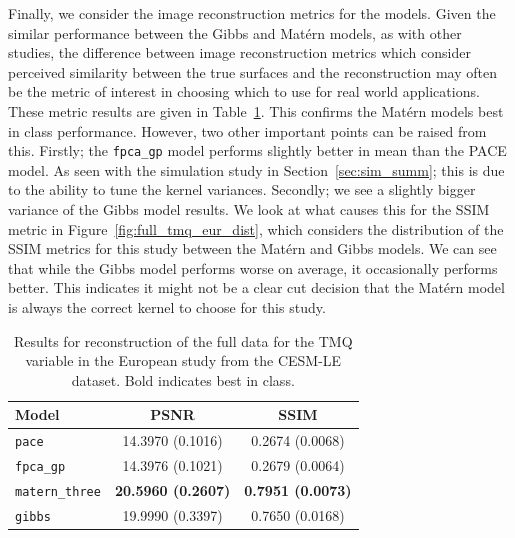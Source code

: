 Finally, we consider the image reconstruction metrics for the models.
Given the similar performance between the Gibbs and Mat\'ern models, as with other studies, the difference between image reconstruction metrics which consider perceived similarity between the true surfaces and the reconstruction may often be the metric of interest in choosing which to use for real world applications.
These metric results are given in Table~\ref{tab:full_cesm_tmq_eur}.
This confirms the Mat\'ern models best in class performance.
However, two other important points can be raised from this.
Firstly; the \verb*|fpca_gp| model performs slightly better in mean than the PACE model.
As seen with the simulation study in Section~\ref{sec:sim_summ}; this is due to  the ability to tune the kernel variances. 
Secondly; we see a slightly bigger variance of the Gibbs model results.
We look at what causes this for the SSIM metric in Figure~\ref{fig:full_tmq_eur_dist}, which considers the distribution of the SSIM metrics for this study between the Mat\'ern and Gibbs models.
We can see that while the Gibbs model performs worse on average, it occasionally performs better.
This indicates it might not be a clear cut decision that the Mat\'ern model is always the correct kernel to choose for this study.

\begin{table}
	\caption[Results for the TMQ variable on full data in the European study.]{Results for reconstruction of the full data for the TMQ variable in the European study from the CESM-LE dataset. Bold indicates best in class.}
	\centering
	\label{tab:full_cesm_tmq_eur}
	\begin{tabular}{lcc}
		\toprule
		\textbf{Model} & \textbf{PSNR} & \textbf{SSIM} \\
		\midrule
		\verb*|pace| & 14.3970 (0.1016) & 0.2674 (0.0068) \\
		\verb*|fpca_gp| & 14.3976 (0.1021) & 0.2679	(0.0064) \\
		\verb*|matern_three| & \textbf{20.5960 (0.2607)}& \textbf{0.7951 (0.0073)}\\
		\verb*|gibbs| & 19.9990	(0.3397)& 0.7650 (0.0168)\\
		\bottomrule
	\end{tabular}
\end{table}

